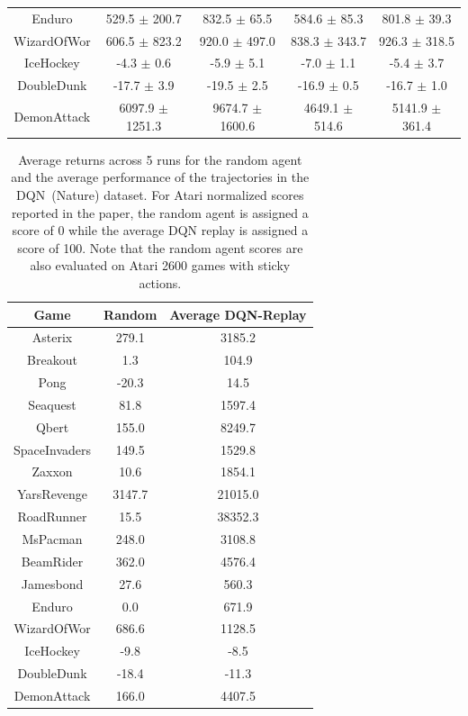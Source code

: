 \begin{table}[h]
\begin{tabular}{ccccc}
Enduro        &     529.5 $\pm$ 200.7 &      832.5 $\pm$ 65.5 &     584.6 $\pm$ 85.3 &      801.8 $\pm$ 39.3 \\
WizardOfWor   &     606.5 $\pm$ 823.2 &     920.0 $\pm$ 497.0 &    838.3 $\pm$ 343.7 &     926.3 $\pm$ 318.5 \\
IceHockey     &        -4.3 $\pm$ 0.6 &        -5.9 $\pm$ 5.1 &       -7.0 $\pm$ 1.1 &        -5.4 $\pm$ 3.7 \\
DoubleDunk    &       -17.7 $\pm$ 3.9 &       -19.5 $\pm$ 2.5 &      -16.9 $\pm$ 0.5 &       -16.7 $\pm$ 1.0 \\
DemonAttack   &   6097.9 $\pm$ 1251.3 &   9674.7 $\pm$ 1600.6 &   4649.1 $\pm$ 514.6 &    5141.9 $\pm$ 361.4 \\
\bottomrule
\end{tabular}
\end{table}




\begin{table}[h]
\centering
    \caption{Average returns across 5 runs for the random agent and the average performance of the trajectories in the DQN~(Nature) dataset. For Atari normalized scores reported in the paper, the random agent is assigned a score of 0 while the average DQN replay is assigned a score of 100. Note that the random agent scores are also evaluated on Atari 2600 games with sticky actions.}
    \label{tab:random_dqn_scores}
    \vspace{0.2cm}
\begin{tabular}{ccc}
\toprule
Game &  Random &  Average DQN-Replay \\
\midrule
Asterix       &   279.1 &              3185.2 \\
Breakout      &     1.3 &               104.9 \\
Pong          &   -20.3 &                14.5 \\
Seaquest      &    81.8 &              1597.4 \\
Qbert         &   155.0 &              8249.7 \\
SpaceInvaders &   149.5 &              1529.8 \\
Zaxxon        &    10.6 &              1854.1 \\
YarsRevenge   &  3147.7 &             21015.0 \\
RoadRunner    &    15.5 &             38352.3 \\
MsPacman      &   248.0 &              3108.8 \\
BeamRider     &   362.0 &              4576.4 \\
Jamesbond     &    27.6 &               560.3 \\
Enduro        &     0.0 &               671.9 \\
WizardOfWor   &   686.6 &              1128.5 \\
IceHockey     &    -9.8 &                -8.5 \\
DoubleDunk    &   -18.4 &               -11.3 \\
DemonAttack   &   166.0 &              4407.5 \\
\bottomrule
\end{tabular}
\end{table}

